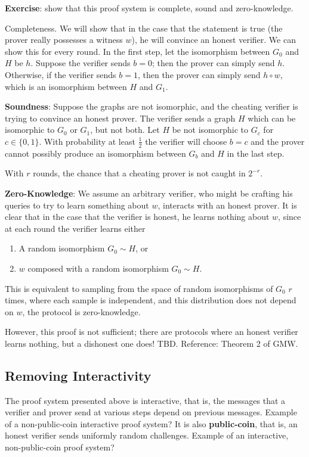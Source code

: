 \documentclass{article}
\newcommand{\todo}[1]{{\leavevmode\color{orange}#1}}
\begin{document}
\textbf{Exercise}: show that this proof system is complete, sound and zero-knowledge.

Completeness. We will show that in the case that the statement is true (the prover really possesses a witness $w$), he will convince an honest verifier. We can show this for every round. In the first step, let the isomorphism between $G_0$ and $H$ be $h$. Suppose the verifier sends $b = 0$; then the prover can simply send $h$. Otherwise, if the verifier sends $b = 1$, then the prover can simply send $h \circ w$, which is an isomorphism between $H$ and $G_1$.

\textbf{Soundness}: Suppose the graphs are not isomorphic, and the cheating verifier is trying to convince an honest prover. The verifier sends a graph $H$ which can be isomorphic to $G_0$ or $G_1$, but not both. Let $H$ be not isomorphic to $G_c$ for $c \in \{0, 1\}$. With probability at least $\frac{1}{2}$ the verifier will choose $b = c$ and the prover cannot possibly produce an isomorphism between $G_b$ and $H$ in the last step.

With $r$ rounds, the chance that a cheating prover is not caught in $2^{-r}$.

\textbf{Zero-Knowledge}: We assume an arbitrary verifier, who might be crafting his queries to try to learn something about $w$, interacts with an honest prover. It is clear that in the case that the verifier is honest, he learns nothing about $w$, since at each round the verifier learns either

\begin{enumerate}
\item{A random isomorphism $G_0 \sim H$, or}
\item{$w$ composed with a random isomorphism $G_0 \sim H$.}
\end{enumerate}

This is equivalent to sampling from the space of random isomorphisms of $G_0$ $r$ times, where each sample is independent, and this distribution does not depend on $w$, the protocol is zero-knowledge.

However, this proof is not sufficient; \todo{there are protocols where an honest verifier learns nothing, but a dishonest one does! TBD.} Reference: Theorem 2 of GMW.

\subsection*{Removing Interactivity}

The proof system presented above is interactive, that is, the messages that a verifier and prover send at various steps depend on previous messages. \todo{Example of a non-public-coin interactive proof system?} It is also \textbf{public-coin}, that is, an honest verifier sends uniformly random challenges. \todo{Example of an interactive, non-public-coin proof system?}
\end{document}
